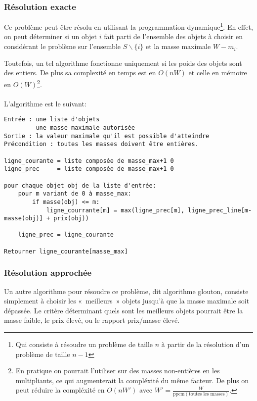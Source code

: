   \subsubsection{Résolution exacte}
    Ce problème peut être résolu en utilisant la programmation
    dynamique\footnote{Qui consiste à résoudre un problème de taille $n$ à
    partir de la résolution d'un problème de taille $n-1$}. En effet, on peut
    déterminer si un objet $i$ fait parti de l'ensemble des objets à choisir en
    considérant le problème sur l'ensemble $S\backslash\{i\}$ et la masse
    maximale $W-m_i$.
    
    Toutefois, un tel algorithme fonctionne uniquement si les poids des objets
    sont des entiers. De plus sa complexité en temps est en $O(nW)$ et celle en
    mémoire en $O(W)$\footnote{En pratique on pourrait l'utiliser sur des
    masses non-entières en les multipliants, ce qui augmenterait la compléxité
    du même facteur. De plus on peut réduire la compléxité en $O(nW')$ avec
    $W' = \frac W {\mathrm{ppcm}(\text{toutes les masses})}$.}.

    \paragraph{}
    L'algorithme est le suivant:
    \begin{lstlisting}
Entrée : une liste d'objets
         une masse maximale autorisée
Sortie : la valeur maximale qu'il est possible d'atteindre
Précondition : toutes les masses doivent être entières.

ligne_courante = liste composée de masse_max+1 0
ligne_prec     = liste composée de masse_max+1 0

pour chaque objet obj de la liste d'entrée:
    pour m variant de 0 à masse_max:
        if masse(obj) <= m:
            ligne_courrante[m] = max(ligne_prec[m], ligne_prec_line[m-masse(obj)] + prix(obj))

    ligne_prec = ligne_courante

Retourner ligne_courante[masse_max]
    \end{lstlisting}

  \subsubsection{Résolution approchée}
    Un autre algorithme pour résoudre ce problème, dit algorithme glouton,
    consiste simplement à choisir les «~meilleurs~» objets jusqu'à que la masse
    maximale soit dépassée. Le critère déterminant quels sont les meilleurs
    objets pourrait être la masse faible, le prix élevé, ou le rapport
    prix/masse élevé.

